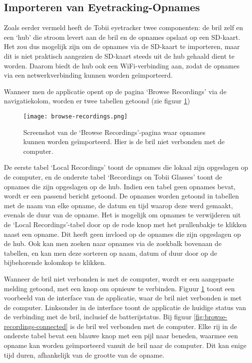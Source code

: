 
\subsection{Importeren van Eyetracking-Opnames}

Zoals eerder vermeld heeft de Tobii eyetracker twee componenten: de bril zelf en een `hub' die stroom levert aan de bril en de opnames opslaat op een SD-kaart.
Het zou dus mogelijk zijn om de opnames via de SD-kaart te importeren, maar dit is niet praktisch aangezien de SD-kaart steeds uit de hub gehaald dient te worden.
Daarom biedt de hub ook een WiFi-verbinding aan, zodat de opnames via een netwerkverbinding kunnen worden geïmporteerd. 

Wanneer men de applicatie opent op de pagina `Browse Recordings' via de navigatiekolom, worden er twee tabellen getoond (zie figuur \ref{fig:browse-recordings})

\begin{figure}[H]
  \centering
  \texttt{[image: browse-recordings.png]}
  \caption[]{\label{fig:browse-recordings} Screenshot van de `Browse Recordings'-pagina waar opnames kunnen worden geïmporteerd. Hier is de bril niet verbonden met de computer. }
\end{figure}


De eerste tabel `Local Recordings' toont de opnames die lokaal zijn opgeslagen op de computer, en de onderste tabel `Recordings on Tobii Glasses' toont de opnames die zijn opgeslagen op de hub.
Indien een tabel geen opnames bevat, wordt er een passend bericht getoond.
De opnames worden getoond in tabellen met de naam van elke opname, de datum en tijd waarop deze werd gemaakt, evenals de duur van de opname. 
Het is mogelijk om opnames te verwijderen uit de `Local Recordings'-tabel door op de rode knop met het prullenbakje te klikken naast een opname. Dit heeft geen invloed op de opnames die zijn opgeslagen op de hub.
Ook kan men zoeken naar opnames via de zoekbalk bovenaan de tabellen, en kan men deze sorteren op naam, datum of duur door op de bijbehorende kolomkop te klikken.

Wanneer de bril niet verbonden is met de computer, wordt er een aangepaste melding getoond, met een knop om opnieuw te verbinden. Figuur \ref{fig:browse-recordings} toont een voorbeeld van de interface van de applicatie, waar de bril niet verbonden is met de computer.
Linksonder in de interface toont de applicatie de huidige status van de verbinding met de bril, inclusief de batterijstatus. Bij figuur \ref{fig:browse-recordings-connected} is de bril wel verbonden met de computer. 
Elke rij in de onderste tabel bevat een blauwe knop met een pijl naar beneden, waarmee een opname kan worden geïmporteerd vanuit de bril naar de computer. Dit kan enige tijd duren, afhankelijk van de grootte van de opname.

